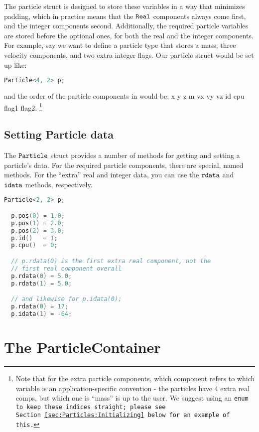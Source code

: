 The particle struct is designed to store these variables in a way that minimizes padding, which in practice means that the $\tt{Real}$ components always come first, and the integer
components second. Additionally, the required particle variables are stored before the optional ones, for both the real and the integer components. For example, say we want to define
a particle type that stores a mass, three velocity components, and two extra integer flags. Our particle struct would be set up like:

\begin{lstlisting}[language=cpp]
  Particle<4, 2> p;
\end{lstlisting}

and the order of the particle components in would be: x y z m vx vy vz id cpu flag1 flag2. \footnote{Note that for the extra particle components, which component refers to which
variable is an application-specific convention - the particles have 4 extra real comps, but which one is ``mass'' is up to the user. We suggest using an \tt{enum} to keep these indices straight; please see Section~\ref{sec:Particles:Initializing} below for an example of this.} 

\subsection{Setting Particle data}

The $\tt{Particle}$ struct provides a number of methods for getting and setting a particle's data. For the required particle components, there are special, named methods. For the 
``extra'' real and integer data, you can use the $\tt{rdata}$ and $\tt{idata}$ methods, respectively. 

\begin{lstlisting}[language=cpp]
  Particle<2, 2> p;

  p.pos(0) = 1.0;
  p.pos(1) = 2.0;
  p.pos(2) = 3.0;
  p.id()   = 1;
  p.cpu()  = 0;

  // p.rdata(0) is the first extra real component, not the 
  // first real component overall
  p.rdata(0) = 5.0;
  p.rdata(1) = 5.0;

  // and likewise for p.idata(0);
  p.rdata(0) = 17;
  p.idata(1) = -64;  
\end{lstlisting}

\section{The ParticleContainer}
\label{sec:Particles:ParticleContainer}
 
